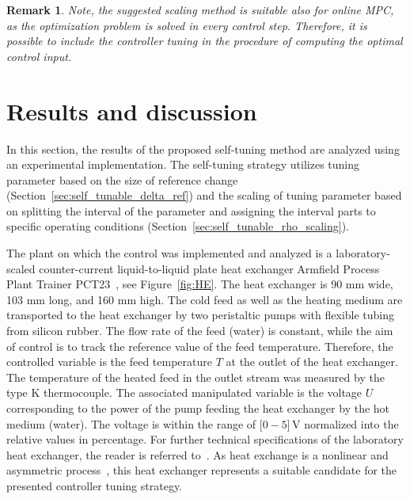 \documentclass[preprint,12pt]{elsarticle}
\newtheorem{remark}[theorem]{Remark}
\begin{document}
	\begin{remark}
		Note, the suggested scaling method is suitable also for online MPC, as the optimization problem is solved in every control step. Therefore, it is possible to include the controller tuning in the procedure of computing the optimal control input.   
	\end{remark}

	
	\section{Results and discussion}
	\label{sec:results}
	
	In this section, the results of the proposed self-tuning method are analyzed using an experimental implementation. The self-tuning strategy utilizes tuning parameter based on the size of reference change (Section~\ref{sec:self_tunable_delta_ref}) and the scaling of tuning parameter based on splitting the interval of the parameter and assigning the interval parts to specific operating conditions (Section~\ref{sec:self_tunable_rho_scaling}).
	
	The plant on which the control was implemented and analyzed is a laboratory-scaled counter-current liquid-to-liquid plate heat exchanger Armfield Process Plant Trainer PCT23~\cite{pct23}, see Figure~\ref{fig:HE}. The heat exchanger is 90 mm wide, 103 mm long, and 160 mm high. The cold feed as well as the heating medium are transported to the heat exchanger by two peristaltic pumps with flexible tubing from silicon rubber. The flow rate of the feed (water) is constant, while the aim of control is to track the reference value of the feed temperature. Therefore, the controlled variable is the feed temperature $T$ at the outlet of the heat exchanger. The temperature of the heated feed in the outlet stream was measured by the type K thermocouple. The associated manipulated variable is the voltage $U$ corresponding to the power of the pump feeding the heat exchanger by the hot medium (water). The voltage is within the range of [$0-5$]\,V normalized into the relative values in percentage. For further technical specifications of the laboratory heat exchanger, the reader is referred to~\cite{pct23}. As heat exchange is a nonlinear and asymmetric process~\cite{Liptak}, this heat exchanger represents a suitable candidate for the presented controller tuning strategy.  
	
\end{document}

